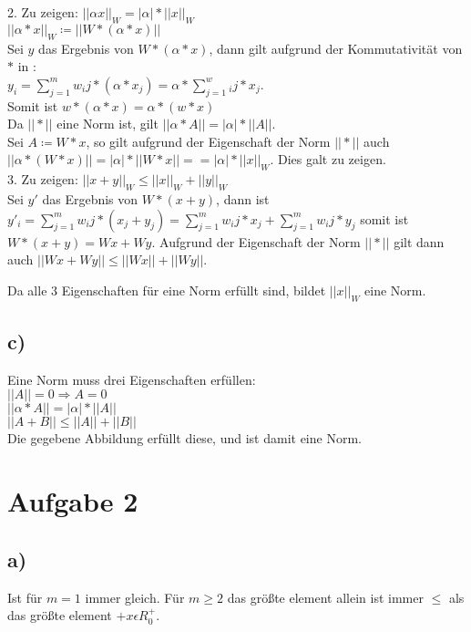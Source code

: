 \documentclass[10pt,a4paper]{article}
\begin{document}
2. Zu zeigen: $||\alpha x||_W = |\alpha|*||x||_W$\\

$||\alpha*x||_W \coloneqq || W * ( \alpha * x )||$\\
Sei $y$ das Ergebnis von $W*(\alpha * x)$, dann gilt aufgrund der Kommutativität von $*$ in :\\ 
$y_i = \sum_{j=1}^m w_ij * (\alpha * x_j) = \alpha*\sum_{j=1}^w_ij*x_j$.\\ 
Somit ist $w*(\alpha * x) = \alpha *(w*x)$\\

Da $||*||$ eine Norm ist, gilt $||\alpha*A|| = |\alpha|*||A||$.\\
Sei $A\coloneqq W*x$, so gilt aufgrund der Eigenschaft der Norm $||*||$ auch $||\alpha*(W*x)|| = |\alpha|*||W*x|| =  = |\alpha|*||x||_W$. Dies galt zu zeigen.\\

3. Zu zeigen: $||x+y||_W \leq ||x||_W +||y||_W$\\

Sei $y'$ das Ergebnis von $W*(x+y)$, dann ist $y'_i = \sum_{j=1}^m w_ij * ( x_j + y_j ) = \sum_{j=1}^m w_ij * x_j + \sum_{j=1}^m w_ij * y_j$ somit ist $W*(x+y) = Wx + Wy$. Aufgrund der Eigenschaft der Norm $||*||$ gilt dann auch $||Wx + Wy|| \leq ||Wx|| + ||Wy||$.

Da alle 3 Eigenschaften für eine Norm erfüllt sind, bildet $||x||_W$ eine Norm.

\subsection*{c)}
Eine Norm muss drei Eigenschaften erfüllen:\\
$||A|| = 0 \Rightarrow A = 0$\\
$||\alpha*A|| = |\alpha|*||A||$\\
$||A+B|| \leq ||A|| + ||B||$\\
Die gegebene Abbildung erfüllt diese, und ist damit eine Norm.

\section*{Aufgabe 2}
\subsection*{a)}
Ist für $m=1$ immer gleich.
Für $m \geq 2$ das größte element allein ist immer $\leq$ als das größte element $+ x\epsilon R_0^+$.
\end{document}
